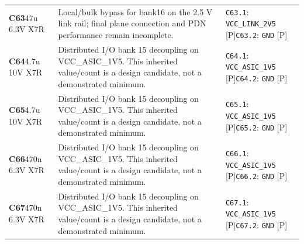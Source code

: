 \documentclass[11pt,a4paper]{article}
\begin{document}
\begin{longtable}{@{}P{27mm}P{83mm}P{58mm}@{}}
\textbf{C63}\newline 47u 6.3V X7R & Local/bulk bypass for bank16 on the 2.5 V link rail; final plane connection and PDN performance remain incomplete. & \nolinkurl{C63.1}: \nolinkurl{VCC_LINK_2V5} [P]\newline \nolinkurl{C63.2}: \nolinkurl{GND} [P] \\
\textbf{C64}\newline 4.7u 10V X7R & Distributed I/O bank 15 decoupling on VCC\_ASIC\_1V5. This inherited value/count is a design candidate, not a demonstrated minimum. & \nolinkurl{C64.1}: \nolinkurl{VCC_ASIC_1V5} [P]\newline \nolinkurl{C64.2}: \nolinkurl{GND} [P] \\
\textbf{C65}\newline 4.7u 10V X7R & Distributed I/O bank 15 decoupling on VCC\_ASIC\_1V5. This inherited value/count is a design candidate, not a demonstrated minimum. & \nolinkurl{C65.1}: \nolinkurl{VCC_ASIC_1V5} [P]\newline \nolinkurl{C65.2}: \nolinkurl{GND} [P] \\
\textbf{C66}\newline 470n 6.3V X7R & Distributed I/O bank 15 decoupling on VCC\_ASIC\_1V5. This inherited value/count is a design candidate, not a demonstrated minimum. & \nolinkurl{C66.1}: \nolinkurl{VCC_ASIC_1V5} [P]\newline \nolinkurl{C66.2}: \nolinkurl{GND} [P] \\
\textbf{C67}\newline 470n 6.3V X7R & Distributed I/O bank 15 decoupling on VCC\_ASIC\_1V5. This inherited value/count is a design candidate, not a demonstrated minimum. & \nolinkurl{C67.1}: \nolinkurl{VCC_ASIC_1V5} [P]\newline \nolinkurl{C67.2}: \nolinkurl{GND} [P] \\

\end{longtable}
\end{document}
